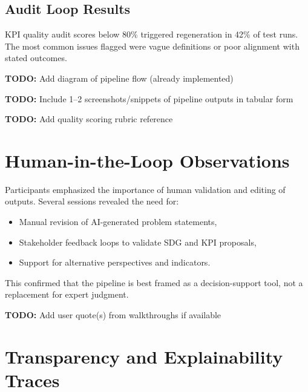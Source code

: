 
\subsection*{Audit Loop Results}

KPI quality audit scores below 80\% triggered regeneration in 42\% of test runs.
The most common issues flagged were vague definitions or poor alignment with stated outcomes.

\textbf{TODO:} Add diagram of pipeline flow (already implemented)

\textbf{TODO:} Include 1–2 screenshots/snippets of pipeline outputs in tabular form

\textbf{TODO:} Add quality scoring rubric reference

\section{Human-in-the-Loop Observations}\label{sec:results-hitl}

Participants emphasized the importance of human validation and editing of outputs.
Several sessions revealed the need for:

\begin{itemize}
    \item Manual revision of AI-generated problem statements,
    \item Stakeholder feedback loops to validate SDG and KPI proposals,
    \item Support for alternative perspectives and indicators.
\end{itemize}

This confirmed that the pipeline is best framed as a decision-support tool, not a replacement for expert judgment.

\textbf{TODO:} Add user quote(s) from walkthroughs if available

\section{Transparency and Explainability Traces}\label{sec:results-xai}

